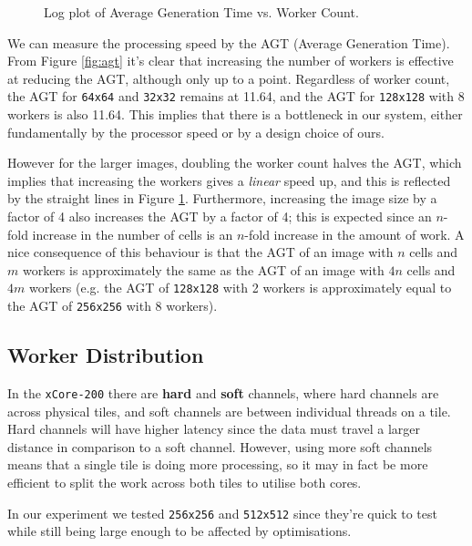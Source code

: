 \documentclass{article}
\begin{document}
    \begin{figure}[h]
        \begin{center}
            
            \caption{Log plot of Average Generation Time vs. Worker Count.}
            \label{fig:agtplot}
        \end{center}
    \end{figure}

    We can measure the processing speed by the AGT (Average Generation Time). From Figure \ref{fig:agt} it's clear that increasing the number of workers is effective at reducing the AGT, although only up to a point. Regardless of worker count, the AGT for \verb|64x64| and \verb|32x32| remains at 11.64, and the AGT for \verb|128x128| with 8 workers is also 11.64. This implies that there is a bottleneck in our system, either fundamentally by the processor speed or by a design choice of ours.

    However for the larger images, doubling the worker count halves the AGT, which implies that increasing the workers gives a \textit{linear} speed up, and this is reflected by the straight lines in Figure \ref{fig:agtplot}. Furthermore, increasing the image size by a factor of 4 also increases the AGT by a factor of 4; this is expected since an $n$-fold increase in the number of cells is an $n$-fold increase in the amount of work. A nice consequence of this behaviour is that the AGT of an image with $n$ cells and $m$ workers is approximately the same as the AGT of an image with $4n$ cells and $4m$ workers (e.g. the AGT of \verb|128x128| with 2 workers is approximately equal to the AGT of \verb|256x256| with 8 workers).

    \subsection{Worker Distribution} \label{workerdistribution}

    In the \verb|xCore-200| there are \textbf{hard} and \textbf{soft} channels, where hard channels are across physical tiles, and soft channels are between individual threads on a tile. Hard channels will have higher latency since the data must travel a larger distance in comparison to a soft channel. However, using more soft channels means that a single tile is doing more processing, so it may in fact be more efficient to split the work across both tiles to utilise both cores.

    In our experiment we tested \verb|256x256| and \verb|512x512| since they're quick to test while still being large enough to be affected by optimisations.
\end{document}
